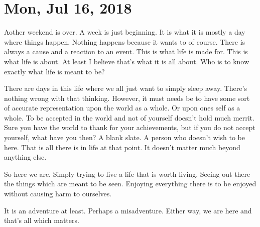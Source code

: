 \section{Mon, Jul 16, 2018}

Aother weekend is over. A week is just beginning. It is what it is mostly a day
where things happen. Nothing happens because it wants to of course. There is
always a cause and a reaction to an event. This is what life is made for. This
is what life is about. At least I believe that's what it is all about. Who is to
know exactly what life is meant to be?

There are days in this life where we all just want to simply sleep away. There's
nothing wrong with that thinking. However, it must needs be to have some sort of
accurate representation upon the world as a whole. Or upon ones self as a whole.
To be accepted in the world and not of yourself doesn't hold much merrit. Sure
you have the world to thank for your achievements, but if you do not accept
yourself, what have you then? A blank slate. A person who doesn't wish to be
here. That is all there is in life at that point. It  doesn't matter much beyond
anything else.

So here we are. Simply trying to live a life that is worth living. Seeing out
there the things which are meant to be seen. Enjoying everything there is to be
enjoyed without causing harm to ourselves.

It is an adventure at least. Perhaps a misadventure. Either way, we are here and
that's all which matters.